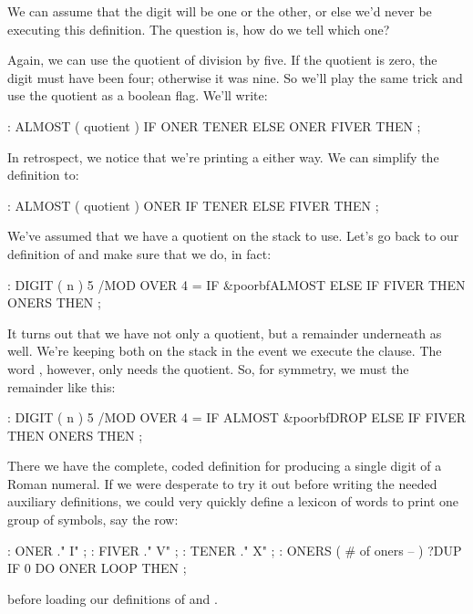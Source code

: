 We can assume that the digit will be one or the other, or else we'd
never be executing this definition. The question is, how do we tell which
one?

Again, we can use the quotient of division by five. If the quotient is
zero, the digit must have been four; otherwise it was nine. So we'll play
the same trick and use the quotient as a boolean flag. We'll write:

\begin{Code}
: ALMOST  ( quotient )
     IF  ONER TENER  ELSE  ONER FIVER  THEN ;
\end{Code}
In retrospect, we notice that we're printing a  either way. We can
simplify the definition to:

\begin{Code}
: ALMOST  ( quotient )
     ONER  IF TENER ELSE FIVER THEN ;
\end{Code}
We've assumed that we have a quotient on the stack to use. Let's go back
to our definition of  and make sure that we do, in fact:

\begin{Code}[commandchars=\&\{\}]
: DIGIT  ( n )
     5 /MOD  OVER 4 =  IF  &poorbf{ALMOST}  ELSE
     IF FIVER THEN  ONERS  THEN ;
\end{Code}
It turns out that we have not only a quotient, but a remainder
underneath as well. We're keeping both on the stack in the event we
execute the  clause. The word , however, only needs the
quotient. So, for symmetry, we must  the remainder like this:

\begin{Code}[commandchars=\&\{\}]
: DIGIT  ( n )
     5 /MOD  OVER 4 =  IF  ALMOST  &poorbf{DROP}  ELSE
     IF FIVER THEN  ONERS  THEN ;
\end{Code}
There we have the complete, coded definition for producing a single digit
of a Roman numeral. If we were desperate to try it out before writing the
needed auxiliary definitions, we could very quickly define a lexicon of
words to print one group of symbols, say the  row:

\begin{Code}
: ONER    ." I" ;
: FIVER   ." V" ;
: TENER   ." X" ;
: ONERS  ( # of oners -- )
     ?DUP IF 0 DO  ONER  LOOP  THEN ;
\end{Code}
before loading our definitions of  and .

